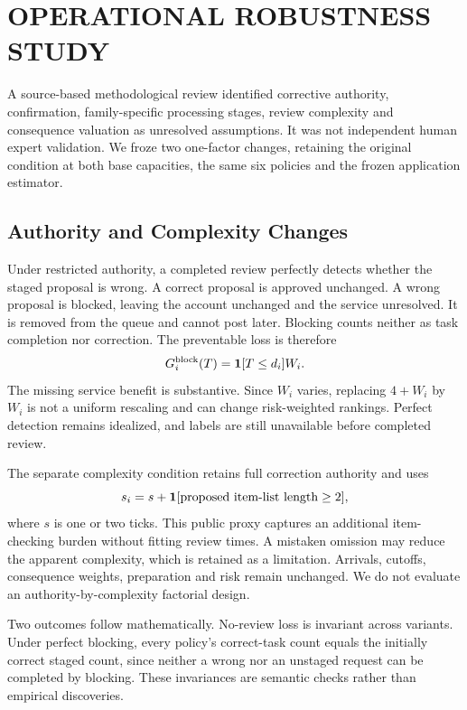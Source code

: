 \section{OPERATIONAL ROBUSTNESS STUDY}
\noindent A source-based methodological review identified corrective authority, confirmation, family-specific processing stages, review complexity and consequence valuation as unresolved assumptions. It was not independent human expert validation. We froze two one-factor changes, retaining the original condition at both base capacities, the same six policies and the frozen application estimator.\draftcredit

\subsection{Authority and Complexity Changes}
Under restricted authority, a completed review perfectly detects whether the staged proposal is wrong. A correct proposal is approved unchanged. A wrong proposal is blocked, leaving the account unchanged and the service unresolved. It is removed from the queue and cannot post later. Blocking counts neither as task completion nor correction. The preventable loss is therefore
\begin{equation}
 G_i^{\mathrm{block}}(T)=\mathbf{1}[T\leq d_i]W_i.
 \label{eq:block}
\end{equation}
The missing service benefit is substantive. Since $W_i$ varies, replacing $4+W_i$ by $W_i$ is not a uniform rescaling and can change risk-weighted rankings. Perfect detection remains idealized, and labels are still unavailable before completed review.

The separate complexity condition retains full correction authority and uses
\begin{equation}
 s_i=s+\mathbf{1}[\text{proposed item-list length}\geq 2],
 \label{eq:complexity}
\end{equation}
where $s$ is one or two ticks. This public proxy captures an additional item-checking burden without fitting review times. A mistaken omission may reduce the apparent complexity, which is retained as a limitation. Arrivals, cutoffs, consequence weights, preparation and risk remain unchanged. We do not evaluate an authority-by-complexity factorial design.

Two outcomes follow mathematically. No-review loss is invariant across variants. Under perfect blocking, every policy's correct-task count equals the initially correct staged count, since neither a wrong nor an unstaged request can be completed by blocking. These invariances are semantic checks rather than empirical discoveries.

